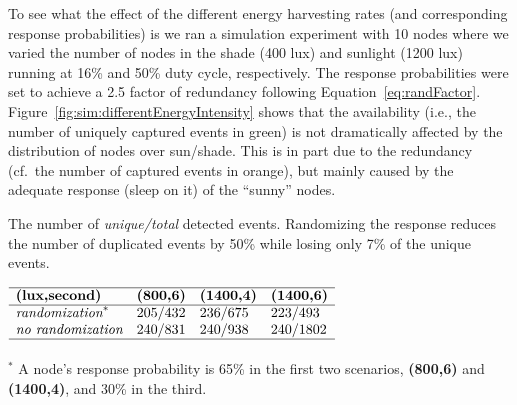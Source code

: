 To see what the effect of the different energy harvesting rates
(and corresponding response probabilities) is we ran a simulation
experiment with 10 nodes where we varied the number of nodes in the
shade (400 lux) and sunlight (1200 lux) running at 16\% and 50\% duty
cycle, respectively. The response probabilities were set to achieve
a 2.5 factor of redundancy following Equation~\ref{eq:randFactor}.
Figure~\ref{fig:sim:differentEnergyIntensity} shows that the \cis
availability (i.e., the number of uniquely captured events in green) is
not dramatically affected by the distribution of nodes over sun/shade.
This is in part due to the redundancy (cf.\ the number of captured events
in orange), but mainly caused by the adequate response (sleep on it)
of the ``sunny'' nodes.
\begin{table}
	\centering
    \caption{The number of \textit{unique/total} detected events.
    Randomizing the response reduces the number of duplicated events by 50\% while losing only 7\% of the unique events.}
    \label{tab:regular_rand}
    $
    \begin{array}{llll}\hline
     \textbf{(lux,second)} & \textbf{(800,6)} & \textbf{(1400,4)} & \textbf{(1400,6)}\\\hline
    \textit{randomization}^{*}    & 205/432 &  236/675 & 223/493 \\
    \textit{no randomization} & 240/831 &  240/938 & 240/1802 \\\hline
    \vspace{-2ex} \\
    \end{array}
    $
    \parbox{0.8\linewidth}{
    $^{*}$ A node's response probability is 65\% in the first two scenarios,
    \textbf{(800,6)} and \textbf{(1400,4)}, and 30\% in the third.}
\end{table}
